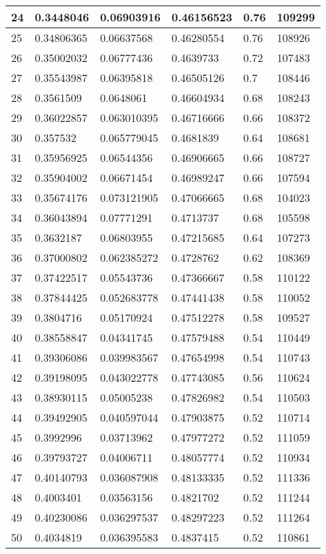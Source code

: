 \begin{longtable}{|l|l|l|l|l|l|}
24 & 0.3448046 & 0.06903916 & 0.46156523 & 0.76 & 109299 \\ \hline 
25 & 0.34806365 & 0.06637568 & 0.46280554 & 0.76 & 108926 \\ \hline 
26 & 0.35002032 & 0.06777436 & 0.4639733 & 0.72 & 107483 \\ \hline 
27 & 0.35543987 & 0.06395818 & 0.46505126 & 0.7 & 108446 \\ \hline 
28 & 0.3561509 & 0.0648061 & 0.46604934 & 0.68 & 108243 \\ \hline 
29 & 0.36022857 & 0.063010395 & 0.46716666 & 0.66 & 108372 \\ \hline 
30 & 0.357532 & 0.065779045 & 0.4681839 & 0.64 & 108681 \\ \hline 
31 & 0.35956925 & 0.06544356 & 0.46906665 & 0.66 & 108727 \\ \hline 
32 & 0.35904002 & 0.06671454 & 0.46989247 & 0.66 & 107594 \\ \hline 
33 & 0.35674176 & 0.073121905 & 0.47066665 & 0.68 & 104023 \\ \hline 
34 & 0.36043894 & 0.07771291 & 0.4713737 & 0.68 & 105598 \\ \hline 
35 & 0.3632187 & 0.06803955 & 0.47215685 & 0.64 & 107273 \\ \hline 
36 & 0.37000802 & 0.062385272 & 0.4728762 & 0.62 & 108369 \\ \hline 
37 & 0.37422517 & 0.05543736 & 0.47366667 & 0.58 & 110122 \\ \hline 
38 & 0.37844425 & 0.052683778 & 0.47441438 & 0.58 & 110052 \\ \hline 
39 & 0.3804716 & 0.05170924 & 0.47512278 & 0.58 & 109527 \\ \hline 
40 & 0.38558847 & 0.04341745 & 0.47579488 & 0.54 & 110449 \\ \hline 
41 & 0.39306086 & 0.039983567 & 0.47654998 & 0.54 & 110743 \\ \hline 
42 & 0.39198095 & 0.043022778 & 0.47743085 & 0.56 & 110624 \\ \hline 
43 & 0.38930115 & 0.05005238 & 0.47826982 & 0.54 & 110503 \\ \hline 
44 & 0.39492905 & 0.040597044 & 0.47903875 & 0.52 & 110714 \\ \hline 
45 & 0.3992996 & 0.03713962 & 0.47977272 & 0.52 & 111059 \\ \hline 
46 & 0.39793727 & 0.04006711 & 0.48057774 & 0.52 & 110934 \\ \hline 
47 & 0.40140793 & 0.036087908 & 0.48133335 & 0.52 & 111336 \\ \hline 
48 & 0.4003401 & 0.03563156 & 0.4821702 & 0.52 & 111244 \\ \hline 
49 & 0.40230086 & 0.036297537 & 0.48297223 & 0.52 & 111264 \\ \hline 
50 & 0.4034819 & 0.036395583 & 0.4837415 & 0.52 & 110861 \\ \hline 
\end{longtable}